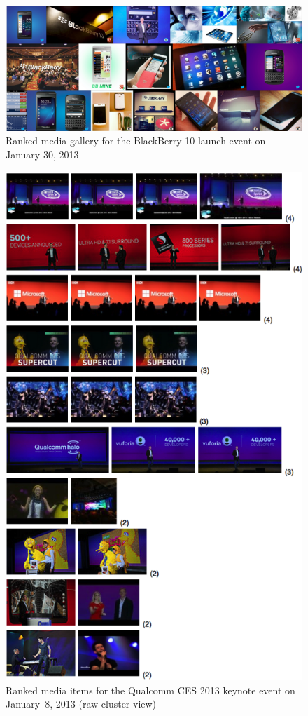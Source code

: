 \begin{figure}[htb]
  \centering
  \includegraphics[width=0.75\linewidth]{blackberry.png}
  \caption[Ranked media gallery for the BlackBerry 10 launch event]
  {Ranked media gallery for the BlackBerry 10 launch event on January 30, 2013}
  \label{fig:blackberry}
\end{figure}

\begin{figure}[htb]
  \centering
  \includegraphics[width=0.75\linewidth]{qualcomm.png}
  \caption[Ranked media items for the Qualcomm CES 2013 keynote event]
  {Ranked media items for the Qualcomm CES 2013 keynote event
  on January~8, 2013 (raw cluster view)}
  \label{fig:qualcomm}
\end{figure}

